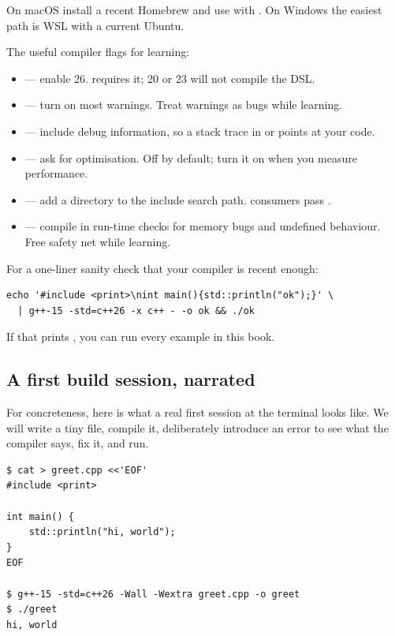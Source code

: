 On macOS install a recent Homebrew  and use 
with . On Windows the easiest path is WSL with a
current Ubuntu.

The useful compiler flags for learning:

\begin{itemize}[leftmargin=*]
  \item {} --- enable \cpp{}26. \maya{} requires it;
    \cpp{}20 or \cpp{}23 will not compile the DSL.
  \item {} --- turn on most warnings. Treat
    warnings as bugs while learning.
  \item {} --- include debug information, so a stack trace
    in  or  points at your code.
  \item {} --- ask for optimisation. Off by default; turn
    it on when you measure performance.
  \item {} --- add a directory to the
    include search path. \maya{} consumers pass
    .
  \item {} --- compile in run-time
    checks for memory bugs and undefined behaviour. Free safety
    net while learning.
\end{itemize}

For a one-liner sanity check that your compiler is recent enough:

\begin{lstlisting}[style=shell]
echo '#include <print>\nint main(){std::println("ok");}' \
  | g++-15 -std=c++26 -x c++ - -o ok && ./ok
\end{lstlisting}

If that prints , you can run every example in this book.

\subsection{A first build session, narrated}

For concreteness, here is what a real first session at the terminal
looks like. We will write a tiny \cpp{} file, compile it, deliberately
introduce an error to see what the compiler says, fix it, and run.

\begin{lstlisting}[style=shell]
$ cat > greet.cpp <<'EOF'
#include <print>

int main() {
    std::println("hi, world");
}
EOF

$ g++-15 -std=c++26 -Wall -Wextra greet.cpp -o greet
$ ./greet
hi, world
\end{lstlisting}

